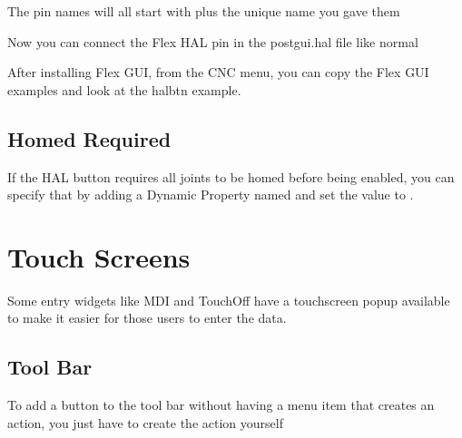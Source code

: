 \documentclass[letterpaper,10pt,english]{sphinxmanual}
\begin{document}
\sphinxAtStartPar
The pin names will all start with  plus the unique name you gave them


\sphinxAtStartPar
Now you can connect the Flex HAL pin in the postgui.hal file like normal

\begin{sphinxVerbatim}[commandchars=\\\{\}]
    
\end{sphinxVerbatim}

\sphinxAtStartPar
After installing Flex GUI, from the CNC menu, you can copy the Flex GUI examples
and look at the hal\sphinxhyphen{}btn example.


\section{Homed Required}
\label{\detokenize{hal:homed-required}}
\sphinxAtStartPar
If the HAL button requires all joints to be homed before being enabled, you can
specify that by adding a Dynamic Property named  and set the value to
.


\sphinxstepscope


\chapter{Touch Screens}
\label{\detokenize{touch:touch-screens}}\label{\detokenize{touch::doc}}
\sphinxAtStartPar
Some entry widgets like MDI and Touch\sphinxhyphen{}Off have a touch\sphinxhyphen{}screen popup available
to make it easier for those users to enter the data.


\section{Tool Bar}
\label{\detokenize{touch:tool-bar}}
\sphinxAtStartPar
To add a button to the tool bar without having a menu item that creates an
action, you just have to create the action yourself
\end{document}
